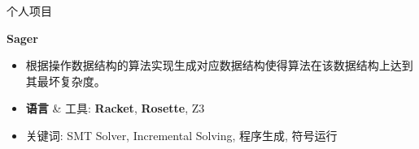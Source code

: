 \documentclass{resume}
\begin{document}
\begin{CJK*}{UTF8}{gbsn}
	\begin{rSection}{个人项目}
	




		\textbf{Sager} %
		\vspace{-5pt}
		\begin{itemize}
			\setlength{\itemsep}{1pt}
            \setlength{\parskip}{0pt}
			\setlength{\parsep}{0pt}
			\item 根据操作数据结构的算法实现生成对应数据结构使得算法在该数据结构上达到其最坏复杂度。
			\item \textbf{语言} \& \textsc{工具}: \textbf{Racket}, \textbf{Rosette}, \textsc{Z3}
			\item 关键词: SMT Solver, Incremental Solving, 程序生成, 符号运行
		\end{itemize}
		\vspace{-5pt}


\end{rSection}
\end{CJK*}
\end{document}
